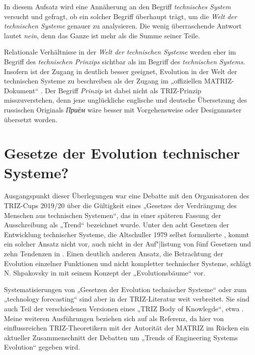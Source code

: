 \documentclass[11pt,a4paper]{article}
\begin{document}
In diesem Aufsatz wird eine Annäherung an den Begriff \emph{technisches
  System} versucht und gefragt, ob ein solcher Begriff überhaupt trägt, um die
\emph{Welt der technischen Systeme} genauer zu analysieren.  Die wenig
überraschende Antwort lautet \emph{nein}, denn das Ganze ist mehr als die
Summe seiner Teile.

Relationale Verhältnisse in der \emph{Welt der technischen Systeme} werden
eher im Begriff des \emph{technischen Prinzips} sichtbar als im Begriff des
\emph{technischen Systems}. Insofern ist der Zugang in \cite{Shpakovsky2010}
deutlich besser geeignet, Evolution in der Welt der technischen Systeme zu
beschreiben als der Zugang im „offiziellen MATRIZ-Dokument“ \cite{TESE2018}.
Der Begriff \emph{Prinzip} ist dabei nicht als TRIZ-Prinzip misszuverstehen,
denn jene unglückliche englische und deutsche Übersetzung des russischen
Originals \emph{\foreignlanguage{russian}{Приём}} wäre besser mit
Vorgehensweise oder Designmuster übersetzt worden.

\section{Gesetze der Evolution technischer Systeme?}

Ausgangspunkt dieser Überlegungen war eine Debatte mit den Organisatoren des
TRIZ-Cups 2019/20 über die Gültigkeit eines „Gesetzes der Verdrängung des
Menschen aus technischen Systemen“, das in einer späteren Fassung der
Ausschreibung als „Trend“ bezeichnet wurde. Unter den acht Gesetzen der
Entwicklung technischer Systeme, die Altschuller 1979 selbst formulierte
\cite[S. 2]{TESE2018}, kommt ein solcher Ansatz nicht vor, auch nicht in der
Auf"|listung von fünf Gesetzen und zehn Tendenzen in
\cite[S. 148\,ff.]{KS2017}.  Einen deutlich anderen Ansatz, die Betrachtung
der Evolution einzelner Funktionen und nicht kompletter technischer Systeme,
schlägt N. Shpakovsky in \cite{Shpakovsky2010} mit seinem Konzept der
„Evolutionsbäume“ vor.

Systematisierungen von „Gesetzen der Evolution technischer Systeme“ oder zum
„technology forecasting“ sind aber in der TRIZ-Literatur weit verbreitet. Sie
sind auch Teil der verschiedenen Versionen eines „TRIZ Body of Knowlegde“,
etwa \cite{TBK-2007}. Meine weiteren Ausführungen beziehen sich auf
\cite{TESE2018} als Referenz, da hier von einflussreichen TRIZ-Theoretikern
mit der Autorität der MATRIZ im Rücken ein aktueller Zusammenschnitt der
Debatten um „Trends of Engineering Systems Evolution“ gegeben wird.
\end{document}
